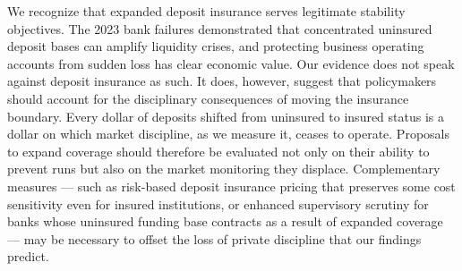 We recognize that expanded deposit insurance serves legitimate stability objectives. The 2023 bank failures demonstrated that concentrated uninsured deposit bases can amplify liquidity crises, and protecting business operating accounts from sudden loss has clear economic value. Our evidence does not speak against deposit insurance as such. It does, however, suggest that policymakers should account for the disciplinary consequences of moving the insurance boundary. Every dollar of deposits shifted from uninsured to insured status is a dollar on which market discipline, as we measure it, ceases to operate. Proposals to expand coverage should therefore be evaluated not only on their ability to prevent runs but also on the market monitoring they displace. Complementary measures — such as risk-based deposit insurance pricing that preserves some cost sensitivity even for insured institutions, or enhanced supervisory scrutiny for banks whose uninsured funding base contracts as a result of expanded coverage — may be necessary to offset the loss of private discipline that our findings predict.

